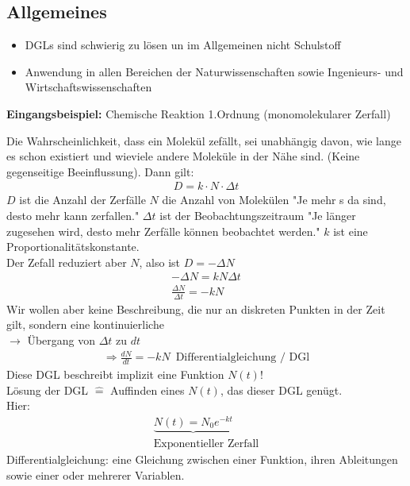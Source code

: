 \documentclass{article}
\begin{document}
\subsection{Allgemeines}
\begin{itemize}
    \item DGLs sind schwierig zu lösen un im Allgemeinen nicht Schulstoff
    \item Anwendung in allen Bereichen der Naturwissenschaften sowie Ingenieurs- und Wirtschaftswissenschaften
\end{itemize}
\textbf{Eingangsbeispiel:}
Chemische Reaktion 1.Ordnung (monomolekularer Zerfall)
\begin{center}
\end{center}
Die Wahrscheinlichkeit, dass ein Molekül  zefällt, sei unabhängig davon, wie lange es schon existiert und wieviele andere Moleküle  in der Nähe sind. (Keine gegenseitige Beeinflussung). Dann gilt:
\begin{eqnarray*}
    D = k\cdot N\cdot\Delta t
\end{eqnarray*}
$D$ ist die Anzahl der Zerfälle $N$ die Anzahl von  Molekülen "Je mehr s da sind, desto mehr kann zerfallen." $\Delta t$ ist der Beobachtungszeitraum "Je länger zugesehen wird, desto mehr Zerfälle können beobachtet werden." $k$ ist eine Proportionalitätskonstante.\\
Der Zefall reduziert aber $N$, also ist $D = -\Delta N$\\
\begin{eqnarray*}
    -\Delta N = kN\Delta t\\
    \frac{\Delta N}{\Delta t} = -kN
\end{eqnarray*}
Wir wollen aber keine Beschreibung, die nur an diskreten Punkten in der Zeit gilt, sondern eine kontinuierliche\\
$\rightarrow$ Übergang von $\Delta t$ zu $dt$
\begin{eqnarray*}
    \Rightarrow \frac{dN}{dt}=-kN\,\text{ Differentialgleichung / DGl}
\end{eqnarray*}
Diese DGL beschreibt implizit eine Funktion $N(t)$!\\
Lösung der DGL $\hat{=}$ Auffinden eines $N(t)$, das dieser DGL genügt.\\
Hier:
\begin{eqnarray*}
    \underbrace{N(t) = N_0e^{-kt}}\\
    \text{Exponentieller Zerfall}
\end{eqnarray*}
Differentialgleichung: eine Gleichung zwischen einer Funktion, ihren Ableitungen sowie einer oder mehrerer Variablen.\\
\end{document}
